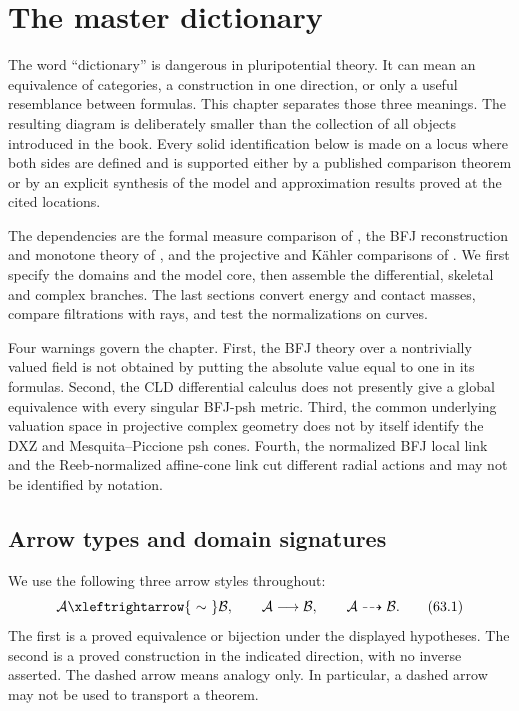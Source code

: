 \chapter{The master dictionary}
\label{chap:master-dictionary}

The word ``dictionary'' is dangerous in pluripotential theory.
It can mean an equivalence of categories, a construction in one direction,
or only a useful resemblance between formulas.
This chapter separates those three meanings.
The resulting diagram is deliberately smaller than the collection of all
objects introduced in the book.
Every solid identification below is made on a locus where both sides are
defined and is supported either by a published comparison theorem or by an
explicit synthesis of the model and approximation results proved at the cited locations.

The dependencies are the formal measure comparison of
, the BFJ reconstruction and monotone theory of
, and the projective
and K\"ahler comparisons of
.
We first specify the domains and the model core, then assemble the
differential, skeletal and complex branches. The last sections convert
energy and contact masses, compare filtrations with rays, and test the
normalizations on curves.

Four warnings govern the chapter.
First, the BFJ theory over a nontrivially valued field is not obtained by
putting the absolute value equal to one in its formulas.
Second, the CLD differential calculus does not presently give a global
equivalence with every singular BFJ-psh metric.
Third, the common underlying valuation space in projective complex geometry
does not by itself identify the DXZ and Mesquita--Piccione psh cones.
Fourth, the normalized BFJ local link and the Reeb-normalized affine-cone
link cut different radial actions and may not be identified by notation.

\section{Arrow types and domain signatures}
\label{sec:dict-domains}

We use the following three arrow styles throughout:
\[
 \mathcal A\xleftrightarrow{\ \sim\ }\mathcal B,
 \qquad
 \mathcal A\longrightarrow\mathcal B,
 \qquad
 \mathcal A\dashrightarrow\mathcal B.
\tag{63.1}\label{eq:dict-arrow-legend}
\]
The first is a proved equivalence or bijection under the displayed
hypotheses.
The second is a proved construction in the indicated direction, with no
inverse asserted.
The dashed arrow means analogy only.
In particular, a dashed arrow may not be used to transport a theorem.

